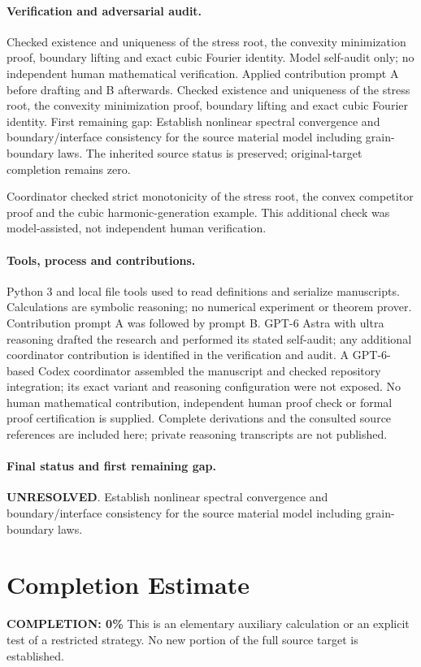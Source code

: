 \documentclass[11pt]{article}
\begin{document}
\paragraph{Verification and adversarial audit.}
Checked existence and uniqueness of the stress root, the convexity minimization proof, boundary lifting and exact cubic Fourier identity. Model self-audit only; no independent human mathematical verification. Applied contribution prompt A before drafting and B afterwards. Checked existence and uniqueness of the stress root, the convexity minimization proof, boundary lifting and exact cubic Fourier identity. First remaining gap: Establish nonlinear spectral convergence and boundary/interface consistency for the source material model including grain-boundary laws. The inherited source status is preserved; original-target completion remains zero.

Coordinator checked strict monotonicity of the stress root, the convex competitor proof and the cubic harmonic-generation example. This additional check was model-assisted, not independent human verification.

\paragraph{Tools, process and contributions.}
Python 3 and local file tools used to read definitions and serialize manuscripts. Calculations are symbolic reasoning; no numerical experiment or theorem prover. Contribution prompt A was followed by prompt B. GPT-6 Astra with ultra reasoning drafted the research and performed its stated self-audit; any additional coordinator contribution is identified in the verification and audit. A GPT-6-based Codex coordinator assembled the manuscript and checked repository integration; its exact variant and reasoning configuration were not exposed. No human mathematical contribution, independent human proof check or formal proof certification is supplied. Complete derivations and the consulted source references are included here; private reasoning transcripts are not published.

\paragraph{Final status and first remaining gap.}
\textbf{UNRESOLVED}. Establish nonlinear spectral convergence and boundary/interface consistency for the source material model including grain-boundary laws.

\section{Completion Estimate}
\noindent\textbf{COMPLETION: 0\%}
This is an elementary auxiliary calculation or an explicit test of a restricted strategy. No new portion of the full source target is established.
\end{document}
